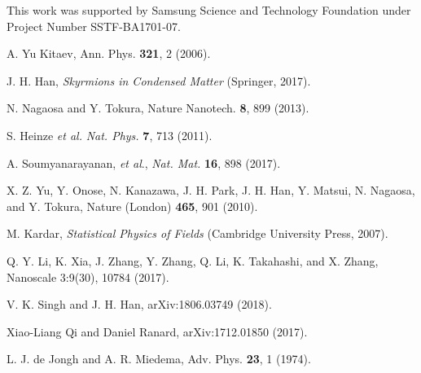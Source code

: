 \documentclass[reprint,amsmath,amssymb,aps,showpacs,superscriptaddress,prb]{revtex4-1}
\begin{document}
This work was supported by Samsung Science and Technology Foundation under Project Number SSTF-BA1701-07.

\begin{thebibliography}{99}

 A. Yu Kitaev, Ann. Phys. {\bf 321}, 2 (2006).

  J. H. Han, {\it Skyrmions in Condensed Matter}  (Springer, 2017).

 N. Nagaosa and Y. Tokura, Nature Nanotech. {\bf 8}, 899 (2013).

 S. Heinze {\it et al.} {\it Nat. Phys.} {\bf 7}, 713 (2011).

 A. Soumyanarayanan, {\it et al}., {\it Nat. Mat.} {\bf 16}, 898 (2017).

 X. Z. Yu, Y. Onose, N. Kanazawa, J. H. Park, J. H. Han, Y. Matsui, N. Nagaosa, and Y. Tokura, Nature (London) {\bf 465}, 901 (2010).

 M. Kardar, {\it Statistical Physics of Fields} (Cambridge University Press, 2007).

 Q. Y. Li, K. Xia, J. Zhang, Y. Zhang, Q. Li, K. Takahashi, and X. Zhang, Nanoscale 3:9(30), 10784 (2017).

 V. K. Singh and J. H. Han, arXiv:1806.03749 (2018).

 Xiao-Liang Qi and Daniel Ranard, arXiv:1712.01850 (2017).

 L. J. de Jongh and A. R. Miedema,
Adv. Phys. {\bf 23}, 1 (1974).



\end{thebibliography}

%
%
\end{document}

